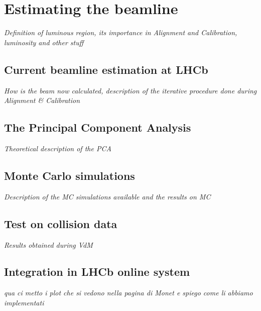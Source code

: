 \chapter{Estimating the beamline}
\textit{Definition of luminous region, its importance in Alignment and Calibration, luminosity and other stuff}

\section{Current beamline estimation at LHCb}
\textit{How is the beam now calculated, description of the iterative procedure done during Alignment \& Calibration}
\section{The Principal Component Analysis}
\textit{Theoretical description of the PCA}

\section{Monte Carlo simulations}
\textit{Description of the MC simulations available and the results on MC}

\section{Test on collision data}
\textit{Results obtained during VdM}

\section{Integration in LHCb online system}
\textit{qua ci metto i plot che si vedono nella pagina di Monet e spiego come li abbiamo implementati}
